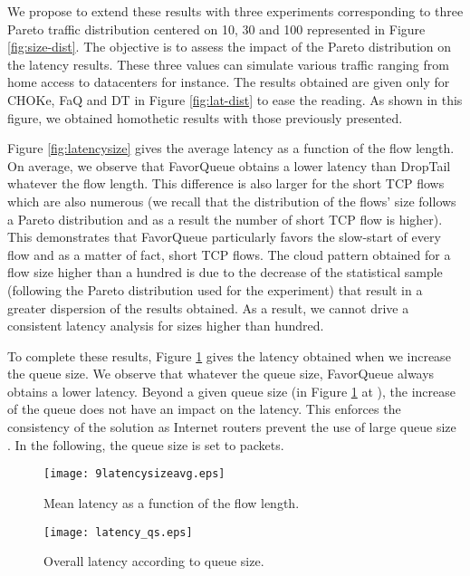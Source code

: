 \documentclass{elsart}
\begin{document}
We propose to extend these results with three experiments corresponding to three Pareto traffic distribution centered on 10, 30 and 100 represented in Figure \ref{fig:size-dist}. The objective is to assess the impact of the Pareto distribution on the latency results. These three values can simulate various traffic ranging from home access to datacenters for instance. The results obtained are given only for CHOKe, FaQ and DT in Figure \ref{fig:lat-dist} to ease the reading. As shown in this figure, we obtained homothetic results with those previously presented.


Figure \ref{fig:latencysize} gives the average latency as a function of the flow length.
On average, we observe that FavorQueue obtains a lower latency than DropTail whatever the flow length. This difference is also larger for the short TCP flows which are also numerous (we recall that the distribution of the flows' size follows a Pareto distribution and as a result the number of short TCP flow is higher). This demonstrates that FavorQueue particularly favors the slow-start of every flow and as a matter of fact, short TCP flows. The cloud pattern obtained for a flow size higher than a hundred is due to the decrease of the statistical sample (following the Pareto distribution used for the experiment) that result in a greater dispersion of the results obtained.
As a result, we cannot drive a consistent latency analysis for sizes higher than hundred.

To complete these results, Figure \ref{fig:latencyqueue} gives the latency obtained when we increase the queue size. We observe that whatever the queue size, FavorQueue always obtains a lower latency. Beyond a given queue size (in Figure \ref{fig:latencyqueue} at ), the increase of the queue does not have an impact on the latency. 
This enforces the consistency of the solution as Internet routers prevent the use of large queue size \cite{Appenzeller04}. In the following, the queue size is set to  packets.

\begin{figure}[htb!]
   \begin{minipage}[b]{1.0\columnwidth}   
	\centering
	\texttt{[image: 9latencysizeavg.eps]}
	\caption{Mean latency as a function of the flow length.}
	\label{fig:latencysize}
   \end{minipage}

   \begin{minipage}[b]{1.0\columnwidth}
	\centering
	\texttt{[image: latency\_qs.eps]}
	\caption{Overall latency according to queue size.}
	\label{fig:latencyqueue}
   \end{minipage}\hfill
\end{figure}
\end{document}
